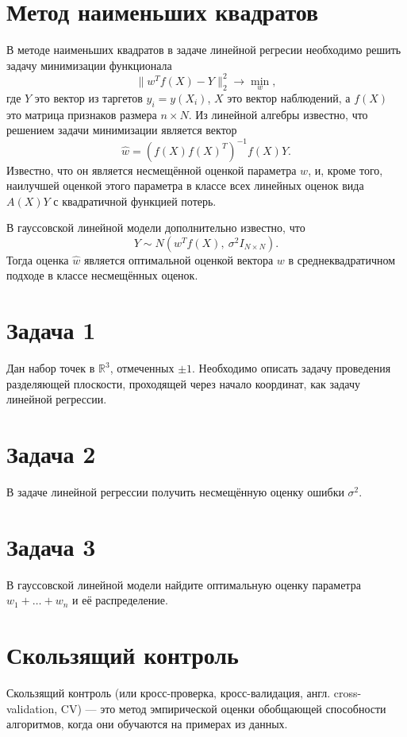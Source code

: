 \section{Метод наименьших квадратов}

В методе наименьших квадратов в задаче линейной регресии необходимо решить задачу минимизации функционала
\[
    \lVert{w^Tf(X) - Y}\rVert_2^2 \to \min_w,
\]
где $Y$ это вектор из таргетов $y_i = y(X_i)$, $X$ это вектор наблюдений, а $f(X)$ это матрица признаков размера $n \times N$.
Из линейной алгебры известно, что решением задачи минимизации является вектор
\[
    \hat{w} = (f(X)f(X)^T)^{-1}f(X)Y.
\]
Известно, что он является несмещённой оценкой параметра $w$, и, кроме того, наилучшей оценкой этого параметра в классе всех линейных оценок вида $A(X)Y$ с квадратичной функцией потерь.

В гауссовской линейной модели дополнительно известно, что
\[
    Y \sim N\left( w^Tf(X),\ \sigma^2 I_{N\times N} \right).
\]
Тогда оценка $\hat{w}$ является оптимальной оценкой вектора $w$ в среднеквадратичном подходе в классе несмещённых оценок.

\section*{Задача 1}

    Дан набор точек в $\mathbb{R}^3$, отмеченных $\pm1$.
    Необходимо описать задачу проведения разделяющей плоскости, проходящей через начало координат, как задачу линейной регрессии.

\section*{Задача 2}

    В задаче линейной регрессии получить несмещённую оценку ошибки $\sigma^2$.


\section*{Задача 3}

    В гауссовской линейной модели найдите оптимальную оценку параметра $w_1 + \ldots +w_n$ и её распределение.

\section{Скользящий контроль}

Скользящий контроль (или кросс-проверка, кросс-валидация, англ. cross-validation, CV) — это метод эмпирической оценки  обобщающей способности алгоритмов, когда они обучаются на примерах из данных.

